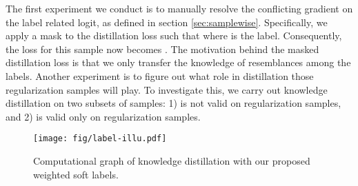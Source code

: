 \documentclass{article} \usepackage{iclr2021_conference,times}
\begin{document}
The first experiment we conduct is to manually resolve the conflicting gradient on the label related logit, as defined in section \ref{sec:samplewise}. Specifically, we apply a mask to the distillation loss  such that  where  is the label. Consequently, the loss for this sample now becomes . 
The motivation behind the masked distillation loss is that we only transfer the knowledge of resemblances among the labels.
Another experiment is to figure out what role in distillation those regularization samples will play. To investigate this, we carry out knowledge distillation on two subsets of samples: 1)  is not valid on regularization samples, and 2)  is valid only on regularization samples. 


\begin{figure}[t]
    \centering
    \vspace{-8pt}
    \texttt{[image: fig/label-illu.pdf]}
\caption{Computational graph of knowledge distillation with our proposed weighted soft labels.}
    \label{fig:label-illu}
\end{figure}

\begin{table}
    \caption{Study of the impact on distillation for regularization samples. Loss function presented here is for the loss on a specific sample. Results are classification Top-1 accuracy. We follow the settings used in Tab. \ref{tab:label-smoothing} and set . Results are averaged over 5 runs.}
    \label{tab:useful}
    \vspace{-10pt}
\end{table}
\end{document}
